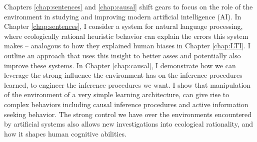 Chapters \ref{chap:sentences} and \ref{chap:causal} shift gears to focus on the role of the environment in studying and improving modern artificial intelligence (AI).  In Chapter \ref{chap:sentences}, I consider a system for natural language processing, where ecologically rational heuristic behavior can explain the errors this system makes -- analogous to how they explained human biases in Chapter \ref{chap:LTI}. I outline an approach that uses this insight to better asses and potentially also improve these systems. In Chapter \ref{chap:causal}, I demonstrate how we can leverage the strong influence the environment has on the inference procedures learned, to engineer the inference procedures we want. I show that manipulation of the environment of a very simple learning architecture, can give rise to complex behaviors including causal inference procedures and active information seeking behavior. The strong control we have over the environments encountered by artificial systems also allows new investigations into ecological rationality, and how it shapes human cognitive abilities.